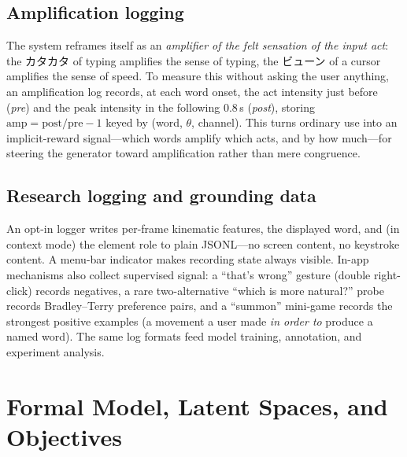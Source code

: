 \documentclass[sigconf,nonacm]{acmart}
\newcommand{\jp}[1]{#1}
\begin{document}
\subsection{Amplification logging}
\label{sec:amplog}
The system reframes itself as an \emph{amplifier of the felt sensation of the input act}: the \jp{カタカタ} of typing amplifies the sense of typing, the \jp{ビューン} of a cursor amplifies the sense of speed. To measure this without asking the user anything, an amplification log records, at each word onset, the act intensity just before (\emph{pre}) and the peak intensity in the following $0.8$\,s (\emph{post}), storing $\mathrm{amp}=\mathrm{post}/\mathrm{pre}-1$ keyed by (word, $\theta$, channel). This turns ordinary use into an implicit-reward signal---which words amplify which acts, and by how much---for steering the generator toward amplification rather than mere congruence.

\subsection{Research logging and grounding data}
An opt-in logger writes per-frame kinematic features, the displayed word, and (in context mode) the element role to plain JSONL---no screen content, no keystroke content. A menu-bar indicator makes recording state always visible. In-app mechanisms also collect supervised signal: a ``that's wrong'' gesture (double right-click) records negatives, a rare two-alternative ``which is more natural?'' probe records Bradley--Terry preference pairs, and a ``summon'' mini-game records the strongest positive examples (a movement a user made \emph{in order to} produce a named word). The same log formats feed model training, annotation, and experiment analysis.

\section{Formal Model, Latent Spaces, and Objectives}
\label{sec:formal}
\end{document}
